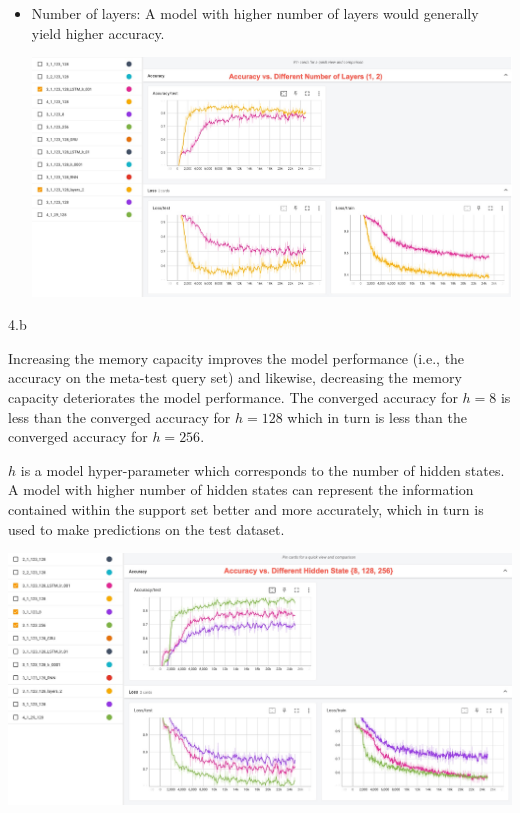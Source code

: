 \begin{answer}
\begin{itemize}
    \item Number of layers: A model with higher number of layers would generally yield higher accuracy. 

    \includegraphics[width=16cm]{figures/hp_layers.jpg}
    
\end{itemize}


\end{answer}

\clearpage

\LARGE
4.b
\normalsize

\begin{answer}
Increasing the memory capacity improves the model performance (i.e., the accuracy on the meta-test query set) and likewise, decreasing the memory capacity deteriorates the model performance. The converged accuracy for $h = 8$ is less than the converged accuracy for $h=128$ which in turn is less than the converged accuracy for $h=256$.

$h$ is a model hyper-parameter which corresponds to the number of hidden states. A model with higher number of hidden states can represent the information contained within the support set better and more accurately, which in turn is used to make predictions on the test dataset.

\includegraphics[width=16cm]{figures/hp_hidden_dim.jpg}

  \end{answer}


